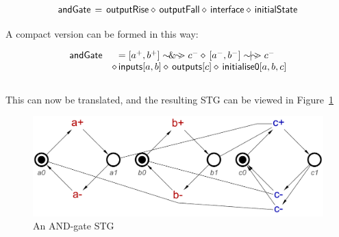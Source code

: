 \documentclass[british,conference,compsoc]{IEEEtran}
\begin{document}
\[
\begin{array}{lcl}
\mathsf{andGate}&\hspace{-2mm}=&\hspace{-2mm}\mathsf{outputRise} \diamond\, \mathsf{outputFall} \diamond\, \mathsf{interface} 
\diamond\, \mathsf{initialState}
\end{array}
\]

\noindent A compact version can be formed in this way:

 \[
\begin{array}{lcl}
\mathsf{andGate}&\hspace{-2mm}=[a^{+}, b^{+}] \sim\hspace{-1.5mm}\&\hspace{-1.5mm}\sim\hspace{-1.5mm}> c^{-} \diamond\, [a^{-}, b^{-}] \sim\hspace{-1.5mm}|\hspace{-1.5mm}\sim\hspace{-1.5mm}> c^{-} \\
&\diamond\, \mathsf{inputs}[a, b] \diamond\, \mathsf{outputs}[c] \diamond\, \mathsf{initialise0} [a, b, c]
\end{array}
\]
\\
\noindent This can now be translated, and the resulting STG can be viewed in Figure~\ref{fig:and-gate-stg}


\begin{figure}[h]
\begin{centering}
\includegraphics[scale=0.25]{Images/and-gate-stg}
\par\end{centering}
\protect\caption{\label{fig:and-gate-stg} An AND-gate STG}
\end{figure}
\end{document}
